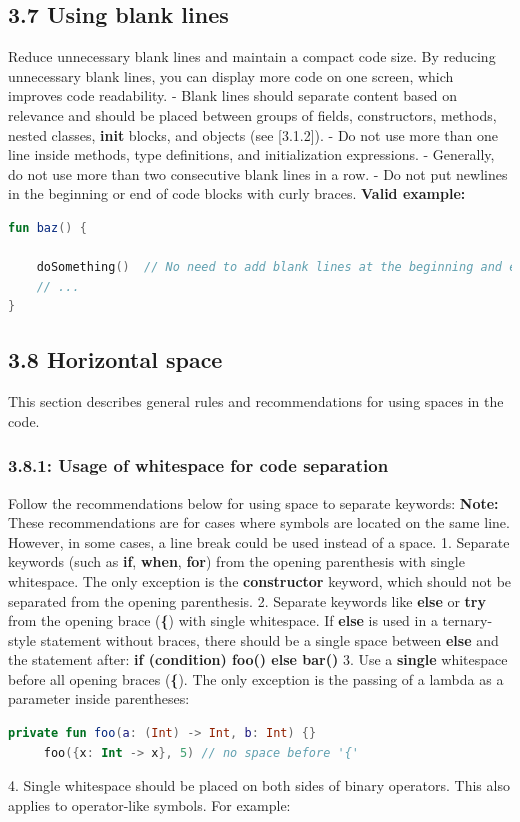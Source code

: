 \subsection*{\textbf{3.7 Using blank lines}}
\label{sec:3.7}
Reduce unnecessary blank lines and maintain a compact code size. By reducing unnecessary blank lines, you can display more code on one screen, which improves code readability.
- Blank lines should separate content based on relevance and should be placed between groups of fields, constructors, methods, nested classes, \textbf{init} blocks, and objects (see [3.1.2]).
- Do not use more than one line inside methods, type definitions, and initialization expressions.
- Generally, do not use more than two consecutive blank lines in a row.
- Do not put newlines in the beginning or end of code blocks with curly braces.
\textbf{Valid example:}
\begin{lstlisting}[language=Kotlin]
fun baz() {

    doSomething()  // No need to add blank lines at the beginning and end of the code block
    // ...
}
\end{lstlisting}
\subsection*{\textbf{3.8 Horizontal space}}
\label{sec:3.8}
This section describes general rules and recommendations for using spaces in the code.
\subsubsection*{\textbf{3.8.1: Usage of whitespace for code separation}}
\leavevmode\newline
\label{sec:3.8.1}
Follow the recommendations below for using space to separate keywords:
\textbf{Note:} These recommendations are for cases where symbols are located on the same line. However, in some cases, a line break could be used instead of a space.
1.  Separate keywords (such as \textbf{if}, \textbf{when}, \textbf{for}) from the opening parenthesis with single whitespace.
    The only exception is the \textbf{constructor} keyword, which should not be separated from the opening parenthesis.
2.  Separate keywords like \textbf{else} or \textbf{try} from the opening brace (\textbf{\{}) with single whitespace.
    If \textbf{else} is used in a ternary-style statement without braces, there should be a single space between \textbf{else} and the statement after: \textbf{if (condition) foo() else bar()}
3.  Use a \textbf{single} whitespace before all opening braces (\textbf{\{}). The only exception is the passing of a lambda as a parameter inside parentheses:
\begin{lstlisting}[language=Kotlin]
     private fun foo(a: (Int) -> Int, b: Int) {}
     foo({x: Int -> x}, 5) // no space before '{'
\end{lstlisting}
4.  Single whitespace should be placed on both sides of binary operators. This also applies to operator-like symbols.
    For example:

